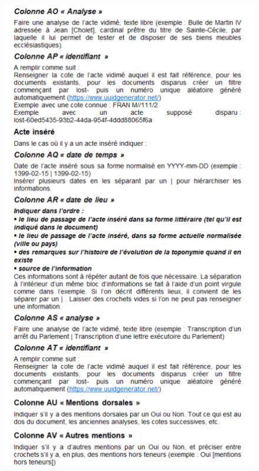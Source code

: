 \begin{figure}[!h]
    \centering
    \includegraphics[width=0.85\linewidth]{annexes/methodologie5.png}
\end{figure}
